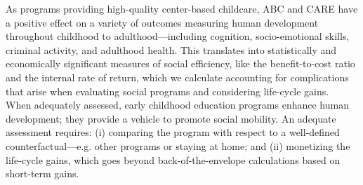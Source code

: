 \noindent As programs providing high-quality center-based childcare, ABC and CARE have a positive effect on a variety of outcomes measuring human development throughout childhood to adulthood---including cognition, socio-emotional skills, criminal activity, and adulthood health. This translates into statistically and economically significant measures of social efficiency, like the benefit-to-cost ratio and the internal rate of return, which we calculate accounting for complications that arise when evaluating social programs and considering life-cycle gains.\\

\noindent When adequately assessed, early childhood education programs enhance human development; they provide a vehicle to promote social mobility. An adequate assessment requires: (i) comparing the program with respect to a well-defined counterfactual---e.g. other programs or staying at home; and (ii) monetizing the life-cycle gains, which goes beyond back-of-the-envelope calculations based on short-term gains. 

\singlespace



 